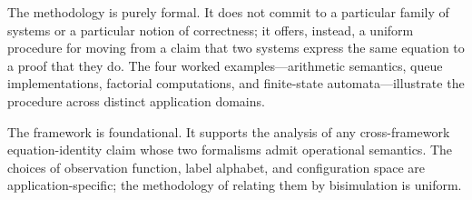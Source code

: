 \documentclass[twocolumn,11pt,a4paper]{article}
\begin{document}
The methodology is purely formal. It does not commit to a particular family of systems or a particular notion of correctness; it offers, instead, a uniform procedure for moving from a claim that two systems express the same equation to a proof that they do. The four worked examples---arithmetic semantics, queue implementations, factorial computations, and finite-state automata---illustrate the procedure across distinct application domains.

The framework is foundational. It supports the analysis of any cross-framework equation-identity claim whose two formalisms admit operational semantics. The choices of observation function, label alphabet, and configuration space are application-specific; the methodology of relating them by bisimulation is uniform.



\end{document}

